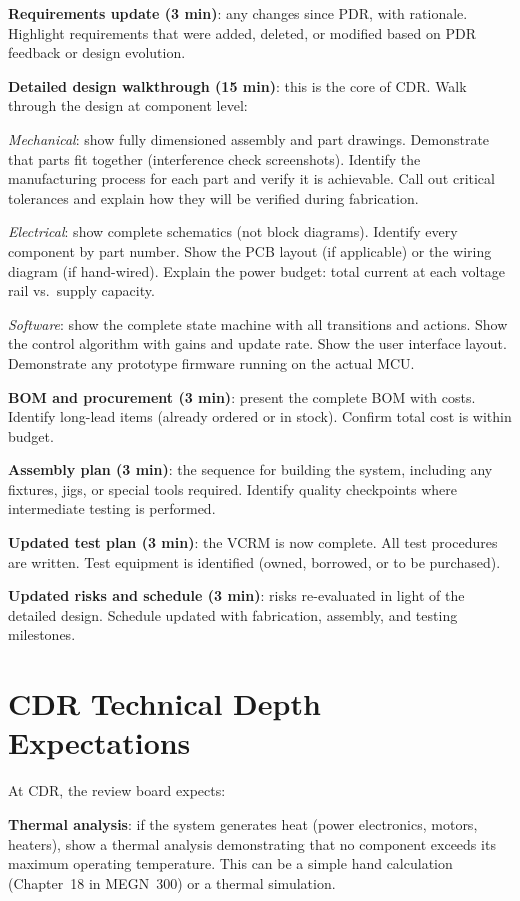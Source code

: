 \documentclass[11pt,letterpaper,twoside,openany]{book}
\begin{document}
\textbf{Requirements update (3 min)}: any changes since PDR, with rationale. Highlight requirements that were added, deleted, or modified based on PDR feedback or design evolution.

\textbf{Detailed design walkthrough (15 min)}: this is the core of CDR. Walk through the design at component level:

\emph{Mechanical}: show fully dimensioned assembly and part drawings. Demonstrate that parts fit together (interference check screenshots). Identify the manufacturing process for each part and verify it is achievable. Call out critical tolerances and explain how they will be verified during fabrication.

\emph{Electrical}: show complete schematics (not block diagrams). Identify every component by part number. Show the PCB layout (if applicable) or the wiring diagram (if hand-wired). Explain the power budget: total current at each voltage rail vs.\ supply capacity.

\emph{Software}: show the complete state machine with all transitions and actions. Show the control algorithm with gains and update rate. Show the user interface layout. Demonstrate any prototype firmware running on the actual MCU.

\textbf{BOM and procurement (3 min)}: present the complete BOM with costs. Identify long-lead items (already ordered or in stock). Confirm total cost is within budget.

\textbf{Assembly plan (3 min)}: the sequence for building the system, including any fixtures, jigs, or special tools required. Identify quality checkpoints where intermediate testing is performed.

\textbf{Updated test plan (3 min)}: the VCRM is now complete. All test procedures are written. Test equipment is identified (owned, borrowed, or to be purchased).

\textbf{Updated risks and schedule (3 min)}: risks re-evaluated in light of the detailed design. Schedule updated with fabrication, assembly, and testing milestones.

\section{CDR Technical Depth Expectations}
At CDR, the review board expects:

\textbf{Thermal analysis}: if the system generates heat (power electronics, motors, heaters), show a thermal analysis demonstrating that no component exceeds its maximum operating temperature. This can be a simple hand calculation (Chapter~18 in MEGN~300) or a thermal simulation.
\end{document}
